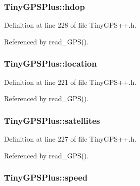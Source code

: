 \subsubsection[{\texorpdfstring{hdop}{hdop}}]{ Tiny\+G\+P\+S\+Plus\+::hdop}\hypertarget{class_tiny_g_p_s_plus_a3a21b3ae7085bb278b35d703bf135632}{}\label{class_tiny_g_p_s_plus_a3a21b3ae7085bb278b35d703bf135632}


Definition at line 228 of file Tiny\+G\+P\+S++.\+h.



Referenced by read\+\_\+\+G\+P\+S().

\subsubsection[{\texorpdfstring{location}{location}}]{ Tiny\+G\+P\+S\+Plus\+::location}\hypertarget{class_tiny_g_p_s_plus_a886255f412f8e01f84e5104d36315fb3}{}\label{class_tiny_g_p_s_plus_a886255f412f8e01f84e5104d36315fb3}


Definition at line 221 of file Tiny\+G\+P\+S++.\+h.



Referenced by read\+\_\+\+G\+P\+S().

\subsubsection[{\texorpdfstring{satellites}{satellites}}]{ Tiny\+G\+P\+S\+Plus\+::satellites}\hypertarget{class_tiny_g_p_s_plus_a5fb47066d1d03f4bb5853529053aab48}{}\label{class_tiny_g_p_s_plus_a5fb47066d1d03f4bb5853529053aab48}


Definition at line 227 of file Tiny\+G\+P\+S++.\+h.



Referenced by read\+\_\+\+G\+P\+S().

\subsubsection[{\texorpdfstring{speed}{speed}}]{ Tiny\+G\+P\+S\+Plus\+::speed}\hypertarget{class_tiny_g_p_s_plus_aa085c3e72a399a829dd92af52b373404}{}\label{class_tiny_g_p_s_plus_aa085c3e72a399a829dd92af52b373404}


